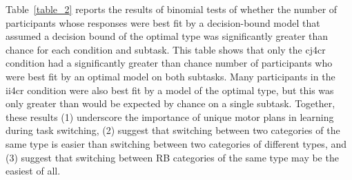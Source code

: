 \documentclass[doc, floatsintext]{apa7}
\begin{document}
Table~\ref{table_2} reports the results of binomial tests of
whether the number of participants whose responses were best
fit by a decision-bound model that assumed a decision bound
of the optimal type was significantly greater than chance
for each condition and subtask. This table shows that only
the cj4cr condition had a significantly greater than chance
number of participants who were best fit by an optimal model
on both subtasks. Many participants in the ii4cr condition
were also best fit by a model of the optimal type, but this
was only greater than would be expected by chance on a
single subtask. Together, these results (1) underscore the
importance of unique motor plans in learning during task
switching, (2) suggest that switching between two categories
of the same type is easier than switching between two
categories of different types, and (3) suggest that
switching between RB categories of the same type may be the
easiest of all.
\end{document}
